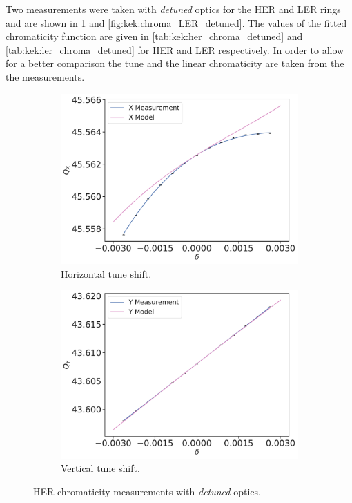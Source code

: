 Two measurements were taken with \textit{detuned} optics for the HER and LER rings and are shown in
\cref{fig:kek:chroma_HER_detuned} and \cref{fig:kek:chroma_LER_detuned}. The values of the fitted
chromaticity function are given in \cref{tab:kek:her_chroma_detuned} and
\cref{tab:kek:ler_chroma_detuned} for HER and LER respectively. In order to allow for a better
comparison the tune and the linear chromaticity are taken from the the measurements.

\begin{figure}[!htb]
    \centering
    \begin{subfigure}[b]{0.49\textwidth}
        \includegraphics[width=\linewidth]{images/kek/chromaticity/HER_09/qx_modelq0q1.pdf}
        \caption{Horizontal tune shift.}
    \end{subfigure}
    \begin{subfigure}[b]{0.49\textwidth}
        \includegraphics[width=\linewidth]{images/kek/chromaticity/HER_09/qy_modelq0q1.pdf}
        \caption{Vertical tune shift.}
    \end{subfigure}
    \caption{HER chromaticity measurements with \textit{detuned} optics.}
    \label{fig:kek:chroma_HER_detuned}
\end{figure}

